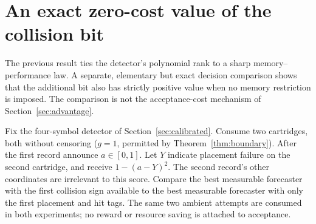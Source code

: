 \section{An exact zero-cost value of the collision bit}\label{sec:mark-value}
The previous result ties the detector's polynomial rank to a sharp
memory--performance law. A separate, elementary but exact decision
comparison shows that the additional bit also has strictly positive value
when no memory restriction is imposed. The comparison is not the
acceptance-cost mechanism of Section~\ref{sec:advantage}.

Fix the four-symbol detector of Section~\ref{sec:calibrated}. Consume two
cartridges, both without censoring ($g=1$, permitted by
Theorem~\ref{thm:boundary}). After the first record announce $a\in[0,1]$.
Let $Y$ indicate placement failure on the second cartridge, and receive
$1-(a-Y)^2$. The second record's other coordinates are irrelevant to this
score. Compare the best measurable forecaster with the first collision
sign available to the best measurable forecaster with only the first
placement and hit tags. The same two ambient attempts are consumed in both
experiments; no reward or resource saving is attached to acceptance.

